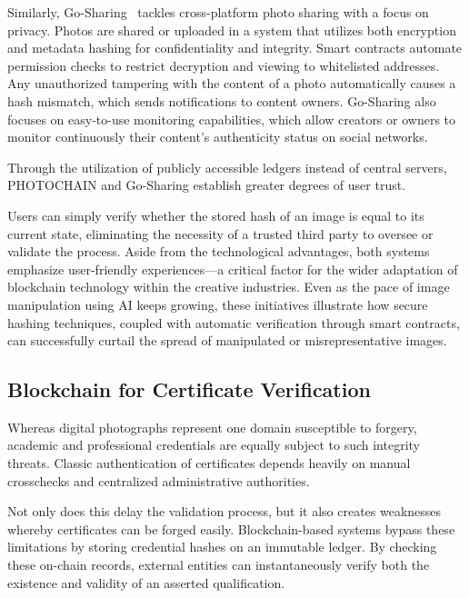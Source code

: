 Similarly, Go-Sharing~\cite{zhang2023} tackles cross-platform photo sharing with a focus
on privacy. Photos are shared or uploaded in a system that utilizes both encryption and
metadata hashing for confidentiality and integrity. Smart contracts automate permission
checks to restrict decryption and viewing to whitelisted addresses. Any unauthorized tampering
with the content of a photo automatically causes a hash mismatch, which sends notifications
to content owners. Go-Sharing also focuses on easy-to-use monitoring capabilities, which allow
creators or owners to monitor continuously their content's authenticity status on social networks.

Through the utilization of publicly accessible ledgers instead of central servers, PHOTOCHAIN
and Go-Sharing establish greater degrees of user trust. 

Users can simply verify whether the
stored hash of an image is equal to its current state, eliminating the necessity of a trusted
third party to oversee or validate the process. Aside from the technological advantages, both
systems emphasize user-friendly experiences---a critical factor for the wider adaptation of
blockchain technology within the creative industries. Even as the pace of image manipulation
using AI keeps growing, these initiatives illustrate how secure hashing techniques, coupled
with automatic verification through smart contracts, can successfully curtail the spread of
manipulated or misrepresentative images.

\subsection{Blockchain for Certificate Verification}

Whereas digital photographs represent one domain susceptible to forgery, academic and
professional credentials are equally subject to such integrity threats. Classic authentication
of certificates depends heavily on manual crosschecks and centralized administrative authorities.

Not only does this delay the validation process, but it also creates weaknesses whereby
certificates can be forged easily. Blockchain-based systems bypass these limitations by storing
credential hashes on an immutable ledger. By checking these on-chain records, external entities
can instantaneously verify both the existence and validity of an asserted qualification.

